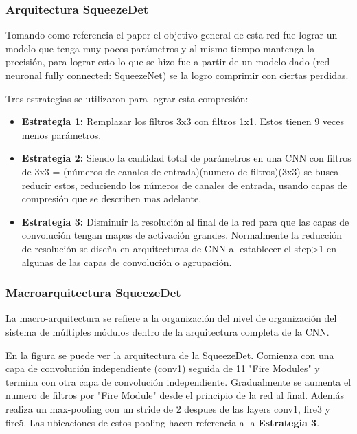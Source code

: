 \subsubsection{Arquitectura SqueezeDet}

Tomando como referencia el paper \cite{SQdet} el objetivo general de esta red fue lograr un modelo que tenga muy pocos parámetros y al mismo tiempo mantenga la precisión, para lograr esto lo que se hizo fue a partir de un modelo dado (red neuronal fully connected: SqueezeNet) se la logro comprimir con ciertas perdidas.\par

Tres estrategias se utilizaron para lograr esta compresión: 
\begin{itemize}
    \item \textbf{Estrategia 1:} Remplazar los filtros 3x3 con filtros 1x1. Estos tienen 9 veces menos parámetros.
    \item \textbf{Estrategia 2:} Siendo la cantidad total de parámetros en una CNN con filtros de 3x3 = (números de canales de entrada)(numero de filtros)(3x3) se busca reducir estos, reduciendo los números de canales de entrada, usando capas de compresión que se describen mas adelante.
    \item \textbf{Estrategia 3:} Disminuir la resolución al final de la red para que las capas de convolución tengan mapas de activación grandes. Normalmente la reducción de resolución se diseña en arquitecturas de CNN al establecer el step>1 en algunas de las capas de convolución o agrupación.
\end{itemize}

\subsubsection{Macroarquitectura SqueezeDet}

La macro-arquitectura se refiere a la organización del nivel de organización del sistema de múltiples módulos dentro de la arquitectura completa de la CNN.\par

En la figura se puede ver la arquitectura de la SqueezeDet. Comienza con una capa de convolución independiente (conv1) seguida de 11 "Fire Modules" y termina con otra capa de convolución independiente. Gradualmente se aumenta el numero de filtros por "Fire Module" desde el principio de la red al final. Además realiza un max-pooling con un stride de 2 despues de las layers conv1, fire3 y fire5. Las ubicaciones de estos pooling hacen referencia a la \textbf{Estrategia 3}.

